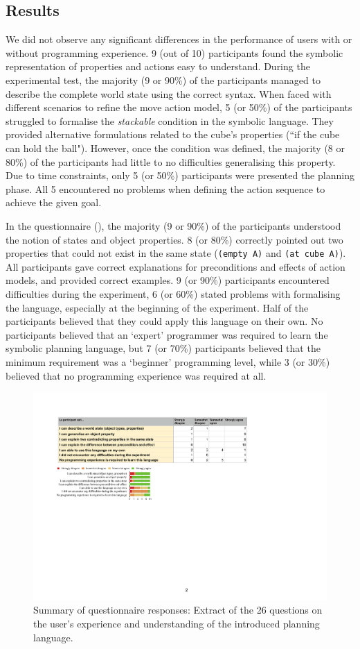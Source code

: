 \subsection{Results}
We did not observe any significant differences in the performance of users with or without programming experience.
9 (out of 10) participants found the symbolic representation of properties and actions easy to understand.
During the experimental test, the majority (9 or 90\%) of the participants managed to describe the complete world state using the correct syntax.
When faced with different scenarios to refine the move action model, 5 (or 50\%) of the participants struggled to formalise the \textit{stackable} condition in the symbolic language.
They provided alternative formulations related to the cube's properties (\eg ``if the cube can hold the ball").
However, once the condition was defined, the majority (8 or 80\%) of the participants had little to no difficulties generalising this property.
Due to time constraints, only 5 (or 50\%) participants were presented the planning phase.
All 5 encountered no problems when defining the action sequence to achieve the given goal.

In the questionnaire (), the majority (9 or 90\%) of the participants understood the notion of states and object properties.
8 (or 80\%) correctly pointed out two properties that could not exist in the same state (\eg \texttt{(empty A)} and \texttt{(at cube A)}).
All participants gave correct explanations for preconditions and effects of action models, and provided correct examples.
9 (or 90\%) participants encountered difficulties during the experiment, 6 (or 60\%) stated problems with formalising the language, especially at the beginning of the experiment.
Half of the participants believed that they could apply this language on their own.
No participants believed that an `expert' programmer was required to learn the symbolic planning language, but 7 (or 70\%) participants believed that the minimum requirement was a `beginner' programming level, while 3 (or 30\%) believed that no programming experience was required at all.


\begin{figure}[ht]
	\centering
	\includegraphics[width=0.85\linewidth]{figures/eEvaluation2}
	\caption{Summary of questionnaire responses: Extract of the 26 questions on the user's experience and understanding of the introduced planning language.}
	\label{fig:eEvaluation2}
\end{figure} 